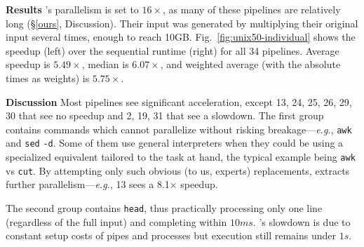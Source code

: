 \documentclass[letterpaper,twocolumn,10pt]{article}
\newcommand{\eg}{{\em e.g.}, }
\newcommand{\heading}[1]{\vspace{4pt}\noindent\textbf{#1}\enspace}
\newcommand{\ttt}[1]{\texttt{#1}}
\newcommand{\TODO}[1]{\hl{\textbf{TODO:} #1}\xspace}
\newcommand{\todo}[1]{\hl{#1}\xspace}
\newcommand{\kk}[1]{[{\color{magenta}kk: #1}]}
\begin{document}

\heading{Results}
\sys's parallelism is set to $16\times$, as many of these pipelines are relatively long (\S\ref{ours}, Discussion).
Their input was generated by multiplying their original input several times, enough to reach 10GB.
Fig.~\ref{fig:unix50-individual} shows the speedup (left) over the sequential runtime (right) for all 34 pipelines.
Average speedup is $5.49\times$, median is $6.07\times$, and weighted average (with the absolute times as weights) is $5.75\times$.



\heading{Discussion}
Most pipelines see significant acceleration, except 13, 24, 25, 26, 29, 30 that see no speedup and 2, 19, 31 that see a slowdown.
The first group contains commands which \sys cannot parallelize without risking breakage---\eg \ttt{awk} and \ttt{sed} \ttt{-d}. %
Some of them use general interpreters when they could be using a specialized equivalent tailored to the task at hand, the typical example being \ttt{awk} vs \ttt{cut}.
By attempting only such obvious (to us, experts) replacements, \sys extracts further parallelism---\eg 13 sees a 8.1$\times$ speedup.

The second group contains \ttt{head}, thus practically processing only one line (regardless of the full input) and completing within $10ms$.
\sys's slowdown is due to constant setup costs of pipes and processes but execution still remains under $1s$.

% 
% 
% 
\end{document}
